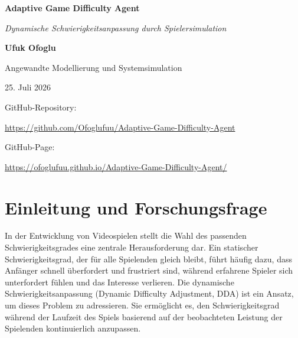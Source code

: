 \documentclass[11pt,a4paper]{article}
\begin{document}
\begin{titlepage}
    \centering
    \vspace*{4cm}
    
    {\Huge \textbf{Adaptive Game Difficulty Agent}\par}
    \vspace{1cm}
    {\Large \textsl{Dynamische Schwierigkeitsanpassung durch Spielersimulation}\par}
    
    \vspace{4cm}
    
    {\Large \textbf{Ufuk Ofoglu}\par}
    \vspace{0.5cm}
    {\large Angewandte Modellierung und Systemsimulation\par}
    \vspace{0.5cm}
    {\large 25. Juli 2026\par}
    
    \vspace{4cm}
    
    {\large GitHub-Repository:\par}
    \vspace{0.2cm}
    {\url{https://github.com/Ofoglufuu/Adaptive-Game-Difficulty-Agent}}
    
    {\large GitHub-Page:\par}
    \vspace{0.2cm}
    {\url{https://ofoglufuu.github.io/Adaptive-Game-Difficulty-Agent/}}
    
    \vfill
\end{titlepage}

\newpage

\section{Einleitung und Forschungsfrage}

In der Entwicklung von Videospielen stellt die Wahl des passenden Schwierigkeitsgrades eine zentrale Herausforderung dar. Ein statischer Schwierigkeitsgrad, der für alle Spielenden gleich bleibt, führt häufig dazu, dass Anfänger schnell überfordert und frustriert sind, während erfahrene Spieler sich unterfordert fühlen und das Interesse verlieren. Die dynamische Schwierigkeitsanpassung (Dynamic Difficulty Adjustment, DDA) ist ein Ansatz, um dieses Problem zu adressieren. Sie ermöglicht es, den Schwierigkeitsgrad während der Laufzeit des Spiels basierend auf der beobachteten Leistung der Spielenden kontinuierlich anzupassen. 
\end{document}
